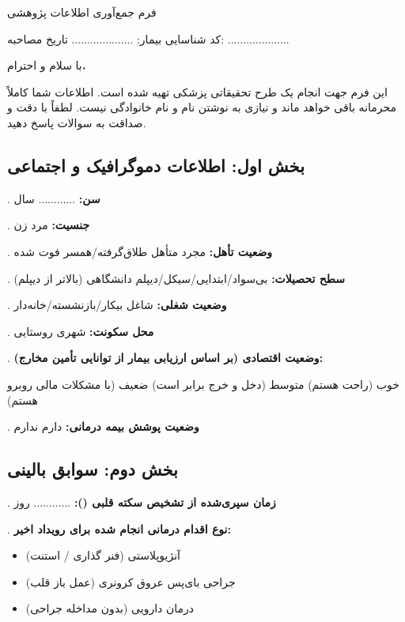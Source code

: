 \newpage
\begin{center}
{\XTitr\fontsize{20pt}{24pt}\selectfont فرم جمع‌آوری اطلاعات پژوهشی}
\end{center}

\noindent کد شناسایی بیمار: .................... \hfill تاریخ مصاحبه: ....................

\medskip
با سلام و احترام،

این فرم جهت انجام یک طرح تحقیقاتی پزشکی تهیه شده است. اطلاعات شما کاملاً محرمانه باقی خواهد ماند و نیازی به نوشتن نام و نام خانوادگی نیست. لطفاً با دقت و صداقت به سوالات پاسخ دهید.

\subsection*{بخش اول: اطلاعات دموگرافیک و اجتماعی}

. \textbf{سن:} ............ سال

. \textbf{جنسیت:} \checkbox{} مرد \quad \checkbox{} زن

. \textbf{وضعیت تأهل:} \checkbox{} مجرد \quad \checkbox{} متأهل \quad \checkbox{} طلاق‌گرفته/همسر فوت شده

. \textbf{سطح تحصیلات:} \checkbox{} بی‌سواد/ابتدایی/سیکل/دیپلم \quad \checkbox{} دانشگاهی (بالاتر از دیپلم)

. \textbf{وضعیت شغلی:} \checkbox{} شاغل \quad \checkbox{} بیکار/بازنشسته/خانه‌دار

. \textbf{محل سکونت:} \checkbox{} شهری \quad \checkbox{} روستایی

. \textbf{وضعیت اقتصادی (بر اساس ارزیابی بیمار از توانایی تأمین مخارج):}

\noindent \checkbox{} خوب (راحت هستم) \quad \checkbox{} متوسط (دخل و خرج برابر است) \quad \checkbox{} ضعیف (با مشکلات مالی روبرو هستم)

. \textbf{وضعیت پوشش بیمه درمانی:} \checkbox{} دارم \quad \checkbox{} ندارم

\subsection*{بخش دوم: سوابق بالینی}

. \textbf{زمان سپری‌شده از تشخیص سکته قلبی ():} ............ روز

. \textbf{نوع اقدام درمانی انجام شده برای رویداد اخیر:}
\begin{itemize}[label={}]
  \item \checkbox{} آنژیوپلاستی (فنر گذاری / استنت)
  \item \checkbox{} جراحی بای‌پس عروق کرونری (عمل باز قلب)
  \item \checkbox{} درمان دارویی (بدون مداخله جراحی)
\end{itemize}


